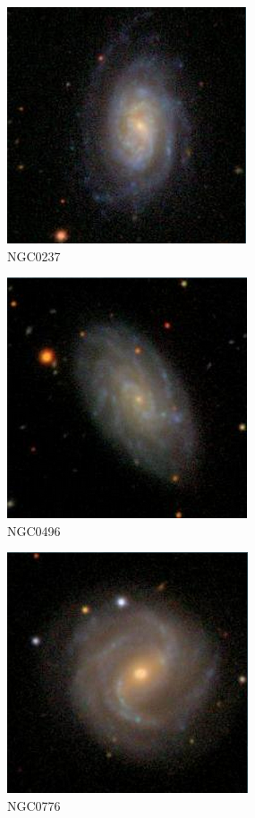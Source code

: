 \documentclass[9pt]{revtex4-1}
\begin{document}
\begin{figure}
\includegraphics[scale=0.3]{NGC0237.png}
\caption{NGC0237}
\end{figure}
\begin{figure}
\includegraphics[scale=0.3]{NGC0496.png}
\caption{NGC0496}
\end{figure}
\begin{figure}
\includegraphics[scale=0.3]{NGC0776.png}
\caption{NGC0776}
\end{figure}
\end{document}
